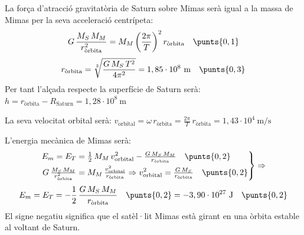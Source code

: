 \begin{solapartat}
La força d'atracció gravitatòria de Saturn sobre Mimas serà igual a la massa de Mimas per la seva acceleració centrípeta: 
\[ G\,\frac{M_S\,M_M}{r_\text{òrbita}^2} = M_M\left(\frac{2\pi}{T}\right)^2 r_\text{òrbita} \quad\punts{0,1} \]
\[ r_\text{òrbita} = \sqrt[3]{\frac{G\,M_S\,T^2}{4\pi^2}} = 1,85\cdot 10^{8}\ \mathrm{m} \quad\punts{0,3} \]
Per tant l'alçada respecte la superfície de Saturn serà: $h = r_\text{òrbita} - R_\mathrm{Saturn} = 1,28\cdot 10^{8}\ \mathrm{m}$ \quad{}

La seva velocitat orbital serà: $v_\mathrm{orbital} = \omega\, r_\text{òrbita} = \frac{2\pi}{T}\, r_\text{òrbita} = 1,43\cdot 10^{4}\ \mathrm{m/s}$ \quad{}
\end{solapartat}

\begin{solapartat}
L'energia mecànica de Mimas serà:
\[ \left.\begin{aligned}
E_m = E_T &= \tfrac{1}{2}\,M_M\,v_\mathrm{orbital}^2 - \tfrac{G\,M_S\,M_M}{r_\text{òrbita}} \quad\punts{0,2}\\
G\,\tfrac{M_S\,M_M}{r_\text{òrbita}^2} &= M_M\,\tfrac{v_\mathrm{orbital}^2}{r_\text{òrbita}} \Rightarrow v_\mathrm{orbital}^2 = \tfrac{G\,M_S}{r_\text{òrbita}} \quad\punts{0,2}
\end{aligned}\right\} \Rightarrow \]
\[ E_m = E_T = -\frac{1}{2}\,\frac{G\,M_S\,M_M}{r_\text{òrbita}} \quad\punts{0,2} = -3,90\cdot 10^{27}\ \mathrm{J} \quad\punts{0,2} \]
El signe negatiu significa que el satèl·lit Mimas està girant en una òrbita estable al voltant de Saturn. 
\end{solapartat}
